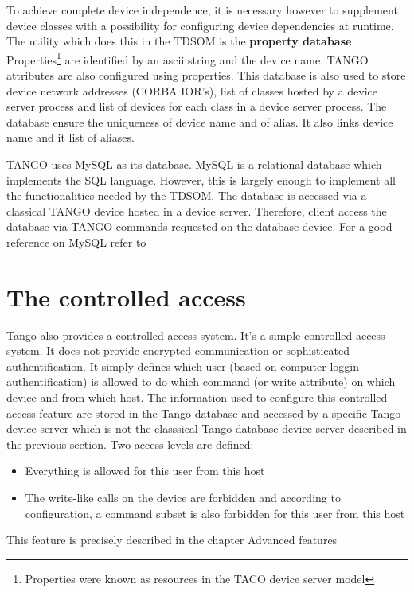 To achieve complete device independence, it is necessary however to
supplement device classes with a possibility for configuring device
dependencies at runtime. The utility which does this in the TDSOM
is the \textbf{property database}. Properties\footnote{Properties were known as resources in the TACO device server model}
are identified by an ascii string and the device name. TANGO attributes
are also configured using properties. This database
is also used to store device network addresses (CORBA IOR's),
list of classes hosted by a device server process and list of devices
for each class in a device server process. The database ensure the
uniqueness of device name and of alias. It also links device name
and it list of aliases.

TANGO uses MySQL\cite{mysql} as its database. MySQL
is a relational database which implements the SQL language. However,
this is largely enough to implement all the functionalities needed
by the TDSOM. The database is accessed via a classical TANGO device
hosted in a device server. Therefore, client access the database via
TANGO commands requested on the database device. For a good reference
on MySQL refer to \cite{MySQL book}

\section{The controlled access}

Tango also provides a controlled access
system. It's a simple controlled access system. It does not provide
encrypted communication or sophisticated authentification. It simply
defines which user (based on computer loggin authentification) is
allowed to do which command (or write attribute) on which device and
from which host. The information used to configure this controlled
access feature are stored in the Tango database and accessed by a
specific Tango device server which is not the classsical Tango database
device server described in the previous section. Two access levels
are defined:
\begin{itemize}
\item Everything is allowed for this user from this host
\item The write-like calls on the device are forbidden and according to
configuration, a command subset is also forbidden for this user from
this host
\end{itemize}
This feature is precisely described in the chapter \textquotedbl{}Advanced
features\textquotedbl{}

